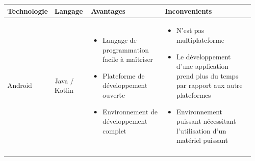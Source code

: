 \documentclass[11pt,a4paper,oneside]{book}
\begin{document}
	\begin{center}
		\begin{tabular}{ |p{2cm}|p{1.5cm}|p{5.5cm}|p{5.5cm}|  }
			\hline
			{\centering 
				Technologie}
			& 
			{\centering 
				Langage
			} & 
			{\centering 
				Avantages
			} & 
			{\centering 
				Inconvenients
			} 
			\\ 
			\hline
			\vspace*{\fill}
			{\centering Android\par} &
			\vspace*{\fill} Java / Kotlin &
			\vspace*{\fill}
			\begin{itemize}
				\item Langage de programmation facile à maîtriser 
				\item Plateforme de développement ouverte
				\item Environnement de développement complet
			\end{itemize} 
			
			&  \vspace*{\fill}
			\begin{itemize}
				\item N’est pas multiplateforme
				\item Le développement d’une application prend plus du temps par rapport aux autre plateformes
				\item Environnement puissant nécessitant l’utilisation d’un matériel puissant
			\end{itemize}
			
			
			\\ 
			\hline
			\vspace*{\fill}
			

\end{tabular}
\end{center}
\end{document}
